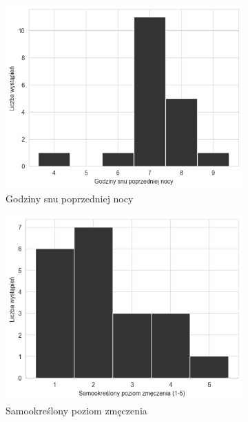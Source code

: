 \documentclass{./assets/wfis}
\begin{document}
\begin{figure}[h!]
\begin{subfigure}[b]{0.45\textwidth}
    \centering
    \includegraphics[width=\columnwidth]{thesis/assets/sleep_histogram.png}
    \caption{Godziny snu poprzedniej nocy}
    \label{fig:sleep-time}
\end{subfigure}   
\hfill
\begin{subfigure}[b]{0.45\textwidth}
    \centering
    \includegraphics[width=\columnwidth]{thesis/assets/exhaustion_level.png}
    \caption{Samookreślony poziom zmęczenia}
    \label{fig:tired}
\end{subfigure}
\begin{subfigure}[b]{0.45\textwidth}

\end{subfigure}
\end{figure}
\end{document}
